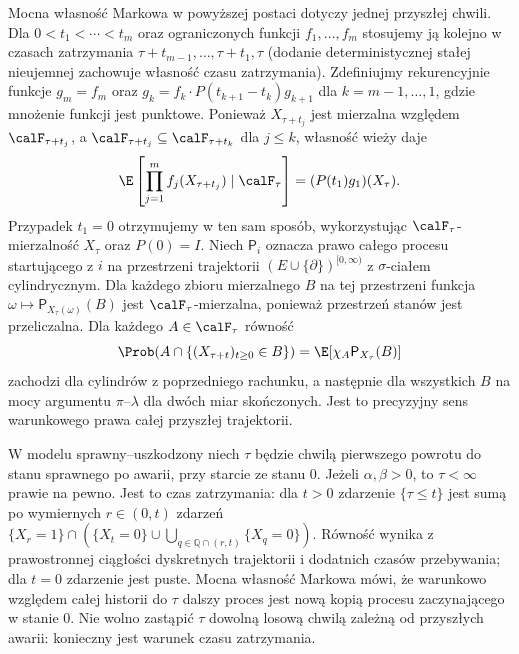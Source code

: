 \begin{uwaga}
Mocna własność Markowa w powyższej postaci dotyczy
jednej przyszłej chwili. Dla $0<t_1<\cdots<t_m$
oraz ograniczonych funkcji $f_1,\ldots,f_m$ stosujemy
ją kolejno w czasach zatrzymania $\tau+t_{m-1},
\ldots,\tau+t_1,\tau$ (dodanie deterministycznej
stałej nieujemnej zachowuje własność czasu zatrzymania).
Zdefiniujmy rekurencyjnie funkcje $g_m=f_m$ oraz
$g_k=f_k\cdot P(t_{k+1}-t_k)g_{k+1}$ dla
$k=m-1,\ldots,1$, gdzie mnożenie funkcji jest punktowe.
Ponieważ $X_{\tau+t_j}$ jest mierzalna względem
$\calF_{\tau+t_j}$, a $\calF_{\tau+t_j}\subseteq
\calF_{\tau+t_k}$ dla $j\le k$, własność wieży daje
\[
\E\left[\prod_{j=1}^m f_j(X_{\tau+t_j})
\mid\calF_\tau\right]=(P(t_1)g_1)(X_\tau).
\]
Przypadek $t_1=0$ otrzymujemy w ten sam sposób,
wykorzystując $\calF_\tau$-mierzalność $X_\tau$
oraz $P(0)=I$.
Niech $\mathsf P_i$ oznacza prawo całego procesu
startującego z $i$ na przestrzeni trajektorii
$(E\cup\{\partial\})^{[0,\infty)}$ z $\sigma$-ciałem
cylindrycznym. Dla każdego zbioru mierzalnego $B$
na tej przestrzeni funkcja
$\omega\mapsto\mathsf P_{X_\tau(\omega)}(B)$
jest $\calF_\tau$-mierzalna, ponieważ przestrzeń
stanów jest przeliczalna. Dla każdego $A\in\calF_\tau$
równość
\[
\Prob(A\cap\{(X_{\tau+t})_{t\ge0}\in B\})
=\E[\chi_A\mathsf P_{X_\tau}(B)]
\]
zachodzi dla cylindrów z poprzedniego rachunku,
a następnie dla wszystkich $B$ na mocy argumentu
$\pi$--$\lambda$ dla dwóch miar skończonych.
Jest to precyzyjny sens warunkowego prawa całej
przyszłej trajektorii.
\end{uwaga}

\begin{przyklad}
W modelu sprawny--uszkodzony niech $\tau$ będzie chwilą
pierwszego powrotu do stanu sprawnego po awarii, przy starcie
ze stanu $0$. Jeżeli $\alpha,\beta>0$, to $\tau<\infty$
prawie na pewno. Jest to czas zatrzymania: dla
$t>0$ zdarzenie $\{\tau\le t\}$ jest sumą po
wymiernych $r\in(0,t)$ zdarzeń
$\{X_r=1\}\cap(\{X_t=0\}\cup
\bigcup_{q\in\mathbb Q\cap(r,t)}\{X_q=0\})$.
Równość wynika z prawostronnej ciągłości dyskretnych
trajektorii i dodatnich czasów przebywania; dla $t=0$
zdarzenie jest puste. Mocna własność Markowa mówi, że warunkowo
względem całej historii do $\tau$ dalszy proces jest
nową kopią procesu zaczynającego w stanie $0$.
Nie wolno zastąpić $\tau$ dowolną losową chwilą zależną
od przyszłych awarii: konieczny jest warunek czasu zatrzymania.
\end{przyklad}


